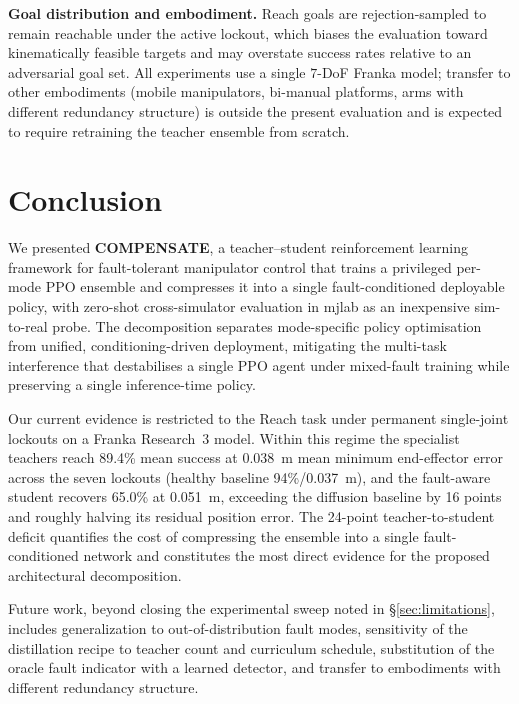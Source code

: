 \documentclass{article}
\begin{document}
	\textbf{Goal distribution and embodiment.} Reach goals are rejection-sampled to remain
	reachable under the active lockout, which biases the evaluation toward kinematically feasible
	targets and may overstate success rates relative to an adversarial goal set. All experiments
	use a single $7$-DoF Franka model; transfer to other embodiments (mobile manipulators,
	bi-manual platforms, arms with different redundancy structure) is outside the present
	evaluation and is expected to require retraining the teacher ensemble from scratch.


\section{Conclusion}
\label{sec:conclusion}

	We presented \textbf{COMPENSATE}, a teacher--student reinforcement learning framework for
	fault-tolerant manipulator control that trains a privileged per-mode PPO ensemble and
	compresses it into a single fault-conditioned deployable policy, with zero-shot cross-simulator
	evaluation in mjlab as an inexpensive sim-to-real probe. The decomposition separates
	mode-specific policy optimisation from unified, conditioning-driven deployment, mitigating the
	multi-task interference that destabilises a single PPO agent under mixed-fault training while
	preserving a single inference-time policy.

	Our current evidence is restricted to the Reach task under permanent single-joint lockouts on
	a Franka Research~3 model. Within this regime the specialist teachers reach 89.4\% mean
	success at 0.038~m mean minimum end-effector error across the seven lockouts (healthy baseline
	94\%/0.037~m), and the fault-aware student recovers 65.0\% at 0.051~m, exceeding the
	diffusion baseline by 16 points and roughly halving its residual position error. The 24-point
	teacher-to-student deficit quantifies the cost of compressing the ensemble into a single
	fault-conditioned network and constitutes the most direct evidence for the proposed
	architectural decomposition.

	Future work, beyond closing the experimental sweep noted in \S\ref{sec:limitations}, includes
	generalization to out-of-distribution fault modes, sensitivity of the distillation recipe to
	teacher count and curriculum schedule, substitution of the oracle fault indicator with a
	learned detector, and transfer to embodiments with different redundancy structure.
\end{document}
